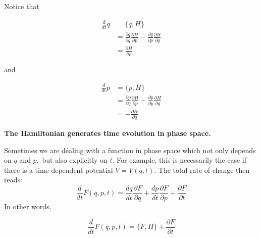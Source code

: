 Notice that
\begin{qt}
    $$
\begin{aligned}
\frac{d}{d t} q &=\{q, H\} \\
&=\frac{\partial q}{\partial q} \frac{\partial H}{\partial p}-\frac{\partial q}{\partial p} \frac{\partial H}{\partial q} \\
&=\frac{\partial H}{\partial p}
\end{aligned}
$$
\end{qt}
and
\begin{qt}
    $$
\begin{aligned}
\frac{d}{d t} p &=\{p, H\} \\
&=\frac{\partial p}{\partial q} \frac{\partial H}{\partial p}-\frac{\partial p}{\partial p} \frac{\partial H}{\partial q} \\
&=-\frac{\partial H}{\partial q}
\end{aligned}
$$
\end{qt}
\begin{qt}
\begin{center}
    \textbf{The Hamiltonian generates time evolution in phase space.}
\end{center}
\end{qt}
Sometimes we are déaling with a function in phase space which not only depends on $q$ and $p,$ but also explicitly on $t .$ For example, this is necessarily the case if there is a time-dependent potential $V=V(q, t) .$ The total rate of change then reads:
\begin{equation}
\frac{d}{d t} F(q, p, t)=\frac{d q}{d t} \frac{\partial F}{\partial q}+\frac{d p}{d t} \frac{\partial F}{\partial p}+\frac{\partial F}{\partial t}
\end{equation}
In other words,
\begin{qt}
\begin{equation}
\frac{d}{d t} F(q, p, t)=\{F, H\}+\frac{\partial F}{\partial t}
\end{equation}
\end{qt}

